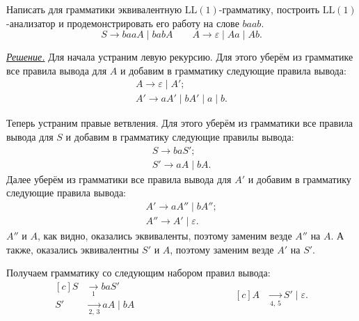 \documentclass[10pt]{article}
\newcounter{pr} \setcounter{pr}{0}
\newenvironment{sol}
  {\par
   {\itshape \underline{Решение.}}}
  {}
\newcommand{\eps}{\varepsilon}
\newcommand{\LL}{\mathrm{LL}}
\begin{document}
  \begin{pr}
    Написать для грамматики  эквивалентную $\LL(1)$-грамматику, построить $\LL(1)$-анализатор и продемонстрировать его работу на слове $baab$.
    \[
      S \to baaA \mid babA \qquad A\to \eps \mid Aa \mid Ab.
    \]
    \begin{sol}
      Для начала устраним левую рекурсию. Для этого уберём из грамматике все правила вывода для $A$ и добавим в грамматику следующие правила вывода:
      \begin{gather*}
        A \to \eps \mid A'; \\
        A' \to aA' \mid bA' \mid a \mid b.
      \end{gather*}

      Теперь устраним правые ветвления. Для этого уберём из грамматики все правила вывода для $S$ и добавим в грамматику следующие правилы вывода:
      \begin{gather*}
        S \to baS'; \\
        S' \to aA \mid bA.
      \end{gather*}
      Далее уберём из грамматики все правила вывода для $A'$ и добавим в грамматику следующие правила вывода:
      \begin{gather*}
        A' \to aA'' \mid bA''; \\
        A'' \to A' \mid \eps.
      \end{gather*}
      $A''$ и $A$, как видно, оказались эквиваленты, поэтому заменим везде $A''$ на $A$. А также, оказались эквивалентны $S'$ и $A$, поэтому заменим везде $A'$ на $S'$.

      Получаем грамматику со следующим набором правил вывода:
      \begin{equation*}
        \begin{aligned}[c]
          S & \xrightarrow[1]{} baS' \\
          S' & \xrightarrow[2,\, 3]{} aA \mid bA
        \end{aligned}
        \hspace{4cm}
        \begin{aligned}[c]
          A & \xrightarrow[4,\, 5]{} S' \mid \eps.
        \end{aligned}
      \end{equation*}


\end{sol}
\end{pr}
\end{document}
